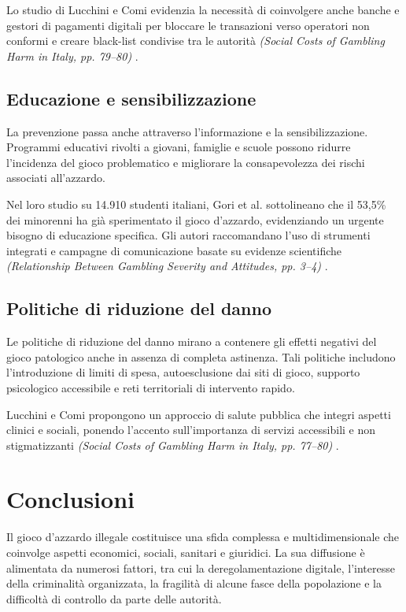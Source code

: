 \documentclass[a4paper,12pt]{article}
\begin{document}
Lo studio di Lucchini e Comi evidenzia la necessità di coinvolgere anche banche e gestori di pagamenti digitali per bloccare le transazioni verso operatori non conformi e creare black-list condivise tra le autorità \textit{(Social Costs of Gambling Harm in Italy, pp. 79--80)} \cite{lucchini2022socialcosts}.

\subsection{Educazione e sensibilizzazione}

La prevenzione passa anche attraverso l’informazione e la sensibilizzazione. Programmi educativi rivolti a giovani, famiglie e scuole possono ridurre l’incidenza del gioco problematico e migliorare la consapevolezza dei rischi associati all’azzardo.

Nel loro studio su 14.910 studenti italiani, Gori et al. sottolineano che il 53,5\% dei minorenni ha già sperimentato il gioco d’azzardo, evidenziando un urgente bisogno di educazione specifica. Gli autori raccomandano l’uso di strumenti integrati e campagne di comunicazione basate su evidenze scientifiche \textit{(Relationship Between Gambling Severity and Attitudes, pp. 3--4)} \cite{gori2014adolescentgambling}.

\subsection{Politiche di riduzione del danno}

Le politiche di riduzione del danno mirano a contenere gli effetti negativi del gioco patologico anche in assenza di completa astinenza. Tali politiche includono l’introduzione di limiti di spesa, autoesclusione dai siti di gioco, supporto psicologico accessibile e reti territoriali di intervento rapido.

Lucchini e Comi propongono un approccio di salute pubblica che integri aspetti clinici e sociali, ponendo l’accento sull'importanza di servizi accessibili e non stigmatizzanti \textit{(Social Costs of Gambling Harm in Italy, pp. 77--80)} \cite{lucchini2022socialcosts}.

\section{Conclusioni}

Il gioco d’azzardo illegale costituisce una sfida complessa e multidimensionale che coinvolge aspetti economici, sociali, sanitari e giuridici. La sua diffusione è alimentata da numerosi fattori, tra cui la deregolamentazione digitale, l’interesse della criminalità organizzata, la fragilità di alcune fasce della popolazione e la difficoltà di controllo da parte delle autorità.
\end{document}
